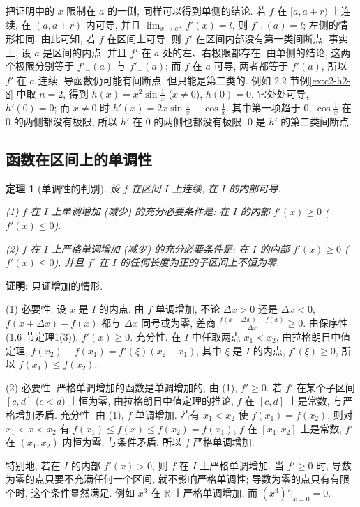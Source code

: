 \documentclass[UTF8,openany]{ctexbook}
\theoremstyle{chinesetextbook}
\newtheorem{theorem}{定理}[section]
\newenvironment{cnproof}{\par\indent\textbf{证明:} \ignorespaces}{\par}
\begin{document}
把证明中的 $x$ 限制在 $a$ 的一侧, 同样可以得到单侧的结论. 若 $f$ 在 $[a,a+r)$ 上连续, 在 $(a,a+r)$ 内可导, 并且 $\displaystyle\lim_{x\to a^+}f'(x)=l$, 则 $f'_+(a)=l$; 左侧的情形相同. 由此可知, 若 $f$ 在区间上可导, 则 $f'$ 在区间内部没有第一类间断点. 事实上, 设 $a$ 是区间的内点, 并且 $f'$ 在 $a$ 处的左、右极限都存在. 由单侧的结论, 这两个极限分别等于 $f'_-(a)$ 与 $f'_+(a)$; 而 $f$ 在 $a$ 可导, 两者都等于 $f'(a)$, 所以 $f'$ 在 $a$ 连续. 导函数仍可能有间断点, 但只能是第二类的. 例如 2.2 节例\ref{ex:c2-h2-8} 中取 $n=2$, 得到 $\displaystyle h(x)=x^2\sin\frac1x$ ($x\ne0$), $h(0)=0$. 它处处可导, $h'(0)=0$; 而 $x\ne0$ 时 $\displaystyle h'(x)=2x\sin\frac1x-\cos\frac1x$. 其中第一项趋于 $0$, $\displaystyle\cos\frac1x$ 在 $0$ 的两侧都没有极限, 所以 $h'$ 在 $0$ 的两侧也都没有极限, $0$ 是 $h'$ 的第二类间断点.
\subsection{函数在区间上的单调性}
\begin{theorem}[单调性的判别]\label{thm:c2-6-mono}
设 $f$ 在区间 $I$ 上连续, 在 $I$ 的内部可导.

\textup{(1)} $f$ 在 $I$ 上单调增加 (减少) 的充分必要条件是: 在 $I$ 的内部 $f'(x)\ge0$ ($f'(x)\le0$).

\textup{(2)} $f$ 在 $I$ 上严格单调增加 (减少) 的充分必要条件是: 在 $I$ 的内部 $f'(x)\ge0$ ($f'(x)\le0$), 并且 $f'$ 在 $I$ 的任何长度为正的子区间上不恒为零.
\end{theorem}
\begin{cnproof}
只证增加的情形.

(1) 必要性. 设 $x$ 是 $I$ 的内点. 由 $f$ 单调增加, 不论 $\Delta x>0$ 还是 $\Delta x<0$, $f(x+\Delta x)-f(x)$ 都与 $\Delta x$ 同号或为零, 差商 $\displaystyle\frac{f(x+\Delta x)-f(x)}{\Delta x}\ge0$. 由保序性 (1.6 节定理1(3)), $f'(x)\ge0$. 充分性. 在 $I$ 中任取两点 $x_1<x_2$, 由拉格朗日中值定理, $f(x_2)-f(x_1)=f'(\xi)(x_2-x_1)$, 其中 $\xi$ 是 $I$ 的内点, $f'(\xi)\ge0$, 所以 $f(x_1)\le f(x_2)$.

(2) 必要性. 严格单调增加的函数是单调增加的, 由 (1), $f'\ge0$. 若 $f'$ 在某个子区间 $[c,d]$ ($c<d$) 上恒为零, 由拉格朗日中值定理的推论, $f$ 在 $[c,d]$ 上是常数, 与严格增加矛盾. 充分性. 由 (1), $f$ 单调增加. 若有 $x_1<x_2$ 使 $f(x_1)=f(x_2)$, 则对 $x_1<x<x_2$ 有 $f(x_1)\le f(x)\le f(x_2)=f(x_1)$, $f$ 在 $[x_1,x_2]$ 上是常数, $f'$ 在 $(x_1,x_2)$ 内恒为零, 与条件矛盾. 所以 $f$ 严格单调增加.
\end{cnproof}
特别地, 若在 $I$ 的内部 $f'(x)>0$, 则 $f$ 在 $I$ 上严格单调增加. 当 $f'\ge0$ 时, 导数为零的点只要不充满任何一个区间, 就不影响严格单调性; 导数为零的点只有有限个时, 这个条件显然满足. 例如 $x^3$ 在 $\mathbb R$ 上严格单调增加, 而 $(x^3)'\big|_{x=0}=0$.
\end{document}
